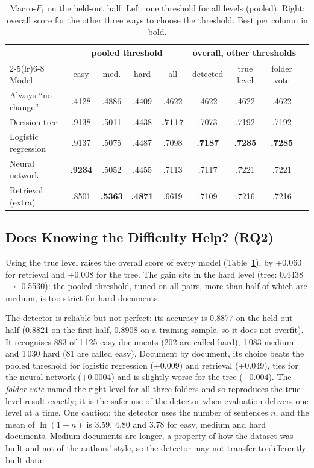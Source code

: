 \documentclass[runningheads]{llncs}
\begin{document}
\begin{table}[t]
\caption{Macro-$F_1$ on the held-out half. Left: one threshold for all levels (pooled). Right: overall score for the other three ways to choose the threshold. Best per column in bold.}
\label{tab:main}
\centering
\setlength{\tabcolsep}{3.6pt}
\footnotesize
\begin{tabular}{lcccccccc}
\toprule
 & \multicolumn{4}{c}{pooled threshold} & \multicolumn{3}{c}{overall, other thresholds}\\
\cmidrule(lr){2-5}\cmidrule(lr){6-8}
Model & easy & med. & hard & all & detected & true level & folder vote\\
\midrule
Always ``no change'' & .4128 & .4886 & .4409 & .4622 & .4622 & .4622 & .4622\\
Decision tree & .9138 & .5011 & .4438 & \textbf{.7117} & .7073 & .7192 & .7192\\
Logistic regression & .9137 & .5075 & .4487 & .7098 & \textbf{.7187} & \textbf{.7285} & \textbf{.7285}\\
Neural network & \textbf{.9234} & .5052 & .4455 & .7113 & .7117 & .7221 & .7221\\
Retrieval (extra) & .8501 & \textbf{.5363} & \textbf{.4871} & .6619 & .7109 & .7216 & .7216\\
\bottomrule
\end{tabular}
\end{table}

\subsection{Does Knowing the Difficulty Help? (RQ2)}

Using the true level raises the overall score of every model (Table~\ref{tab:main}), by +0.060 for retrieval and +0.008 for the tree. The gain sits in the hard level (tree: 0.4438 $\to$ 0.5530): the pooled threshold, tuned on all pairs, more than half of which are medium, is too strict for hard documents.

The detector is reliable but not perfect: its accuracy is 0.8877 on the held-out half (0.8821 on the first half, 0.8908 on a training sample, so it does not overfit). It recognises 883 of 1\,125 easy documents (202 are called hard), 1\,083 medium and 1\,030 hard (81 are called easy). Document by document, its choice beats the pooled threshold for logistic regression (+0.009) and retrieval (+0.049), ties for the neural network (+0.0004) and is slightly worse for the tree ($-$0.004). The \emph{folder vote} named the right level for all three folders and so reproduces the true-level result exactly; it is the safer use of the detector when evaluation delivers one level at a time. One caution: the detector uses the number of sentences $n$, and the mean of $\ln(1+n)$ is 3.59, 4.80 and 3.78 for easy, medium and hard documents. Medium documents are longer, a property of how the dataset was built and not of the authors' style, so the detector may not transfer to differently built data.
\end{document}
